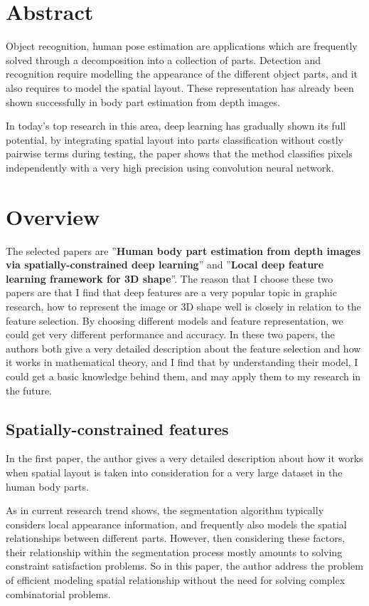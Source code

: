 \documentclass[pdftex,12pt,a4paper]{article}
\begin{document}


\section{Abstract}
\indent Object recognition, human pose estimation are applications which are frequently solved through a decomposition into a collection of parts. Detection and recognition require modelling the appearance of the different object parts, and it also requires to model the spatial layout. These representation has already been shown successfully in body part estimation from depth images.

In today's top research in this area, deep learning has gradually shown its full potential, by integrating spatial layout into parts classification without costly pairwise terms during testing, the paper shows that the method classifies pixels independently with a very high precision using convolution neural network.

\section{Overview}
\indent The selected papers are ''\textbf{Human body part estimation from depth images via spatially-constrained deep learning}'' and ''\textbf{Local deep feature learning framework for 3D shape}''. The reason that I choose these two papers are that I find that deep features are a very popular topic in graphic research, how to represent the image or 3D shape well is closely in relation to the feature selection. By choosing different models and feature representation, we could get very different performance and accuracy. In these two papers, the authors both give a very detailed description about the feature selection and how it works in mathematical theory, and I find that by understanding their model, I could get a basic knowledge behind them, and may apply them to my research in the future.

\subsection{Spatially-constrained features}
\indent In the first paper, the author gives a very detailed description about how it works when spatial layout is taken into consideration for a very large dataset in the human body parts.

As in current research trend shows, the segmentation algorithm typically considers local appearance information, and frequently also models the spatial relationships between different parts. However, then considering these factors, their relationship within the segmentation process mostly amounts to solving constraint satisfaction problems. So in this paper, the author address the problem of efficient modeling spatial relationship without the need for solving complex combinatorial problems.
\end{document}
